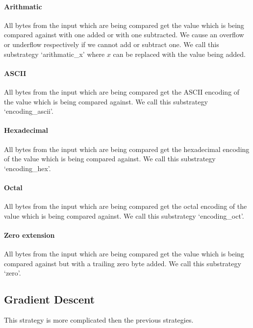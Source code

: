 \paragraph{Arithmatic}
All bytes from the input which are being compared get the value which is being compared against with one added or with one subtracted. We cause an overflow or underflow respectively if we cannot add or subtract one. %
We call this substrategy `arithmatic\_x' where $x$ can be replaced with the value being added.
\paragraph{ASCII}
All bytes from the input which are being compared get the ASCII encoding of the value which is being compared against.
We call this substrategy `encoding\_ascii'.
\paragraph{Hexadecimal}
All bytes from the input which are being compared get the hexadecimal encoding of the value which is being compared against.
We call this substrategy `encoding\_hex'.
\paragraph{Octal}
All bytes from the input which are being compared get the octal encoding of the value which is being compared against.
We call this substrategy `encoding\_oct'.
\paragraph{Zero extension}
All bytes from the input which are being compared get the value which is being compared against but with a trailing zero byte added.
We call this substrategy `zero'.


\subsection{Gradient Descent}
This strategy is more complicated then the previous strategies.

